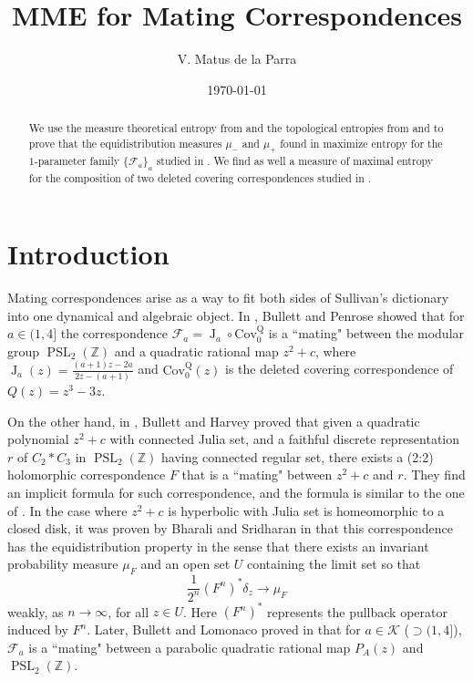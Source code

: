 \documentclass[11pt,letterpaper]{article}
\theoremstyle{definition}
\def\PSL{\operatorname{PSL}}
\def\covq{\operatorname{Cov^Q_0}}
\def\F{\mathcal{F}_a}
\def\J{\operatorname{J}_a}
\begin{document}
\title{MME for Mating Correspondences}
\date{\today}
\author{V. Matus de la Parra}


\maketitle

\begin{abstract}
We use the measure theoretical entropy from \cite{VivSir22} and the topological entropies from \cite{DinSib08II} and \cite{KelTen17} to prove that the equidistribution measures $\mu_-$ and $\mu_+$ found in \cite{Mat23} maximize entropy for the $1$-parameter family $\lbrace\F\rbrace_a$ studied in \cite{BulLom20I}. We find as well a measure of maximal entropy for the composition of two deleted covering correspondences studied in \cite{Bul00}.
\end{abstract}

\section*{Introduction}

Mating correspondences arise as a way to fit both sides of Sullivan's dictionary into one dynamical and algebraic object. In \cite{BulPen94}, Bullett and Penrose showed that for $a\in(1,4]$ the correspondence $\F=\J\circ\covq$ is a ``mating" between the modular group $\PSL_2(\mathbb{Z})$ and a quadratic rational map $z^2+c$, where $\J(z)=\frac{(a+1)z-2a}{2z-(a+1)}$ and $\covq(z)$ is the deleted covering correspondence of $Q(z)=z^3-3z$.


On the other hand, in \cite{BulHar00}, Bullett and Harvey proved that given a quadratic polynomial $z^2+c$ with connected Julia set, and a faithful discrete representation $r$ of $C_2*C_3$ in $\PSL_2(\mathbb{Z})$ having connected regular set, there exists a (2:2) holomorphic correspondence $F$ that is a ``mating" between $z^2+c$ and $r$. They find an implicit formula for such correspondence, and the formula is similar to the one of \cite{BulPen94}. In the case where $z^2+c$ is hyperbolic with Julia set is homeomorphic to a closed disk, it was proven by Bharali and Sridharan in \cite{BhaSri16} that this correspondence has the equidistribution property in the sense that there exists an invariant probability measure $\mu_F$ and an open set $U$ containing the limit set so that
$$\frac{1}{2^n}(F^n)^*\delta_z\to\mu_F$$
weakly, as $n\to\infty$, for all $z\in U$. Here $(F^n)^*$ represents the pullback operator induced by $F^n$.
Later, Bullett and Lomonaco proved in \cite{BulLom20I} that for $a\in\mathcal{K}$ ($\supset(1,4]$), $\F$ is a ``mating" between a parabolic quadratic rational map $P_A(z)$ and $\PSL_2(\mathbb{Z})$. 
\end{document}
